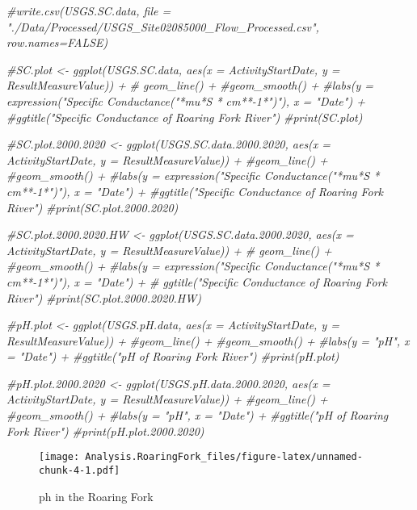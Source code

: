 \documentclass[]{article}
\newenvironment{Shaded}{\begin{snugshade}}{\end{snugshade}}
\newcommand{\CommentTok}[1]{\textcolor[rgb]{0.56,0.35,0.01}{\textit{#1}}}
\begin{document}
\begin{Shaded}
\begin{Highlighting}[]
\CommentTok{#write.csv(USGS.SC.data, file = "./Data/Processed/USGS_Site02085000_Flow_Processed.csv", row.names=FALSE)}
\end{Highlighting}
\end{Shaded}

\begin{Shaded}
\begin{Highlighting}[]
\CommentTok{#SC.plot <- ggplot(USGS.SC.data, aes(x = ActivityStartDate, y = ResultMeasureValue)) +}
 \CommentTok{# geom_line() +}
  \CommentTok{#geom_smooth() +}
  \CommentTok{#labs(y = expression("Specific Conductance("*mu*S * cm**-1*")"), x = "Date") +}
    \CommentTok{#ggtitle("Specific Conductance of Roaring Fork River")}
\CommentTok{#print(SC.plot)}


\CommentTok{#SC.plot.2000.2020 <- ggplot(USGS.SC.data.2000.2020, aes(x = ActivityStartDate, y = ResultMeasureValue)) +}
  \CommentTok{#geom_line() +}
  \CommentTok{#geom_smooth() +}
  \CommentTok{#labs(y = expression("Specific Conductance("*mu*S * cm**-1*")"), x = "Date") +}
    \CommentTok{#ggtitle("Specific Conductance of Roaring Fork River")}
\CommentTok{#print(SC.plot.2000.2020)}

\CommentTok{#SC.plot.2000.2020.HW <- ggplot(USGS.SC.data.2000.2020, aes(x = ActivityStartDate, y = ResultMeasureValue)) +}
 \CommentTok{# geom_line() +}
  \CommentTok{#geom_smooth() +}
  \CommentTok{#labs(y = expression("Specific Conductance("*mu*S * cm**-1*")"), x = "Date") +}
   \CommentTok{# ggtitle("Specific Conductance of Roaring Fork River")}
\CommentTok{#print(SC.plot.2000.2020.HW)}

\CommentTok{#pH.plot <- ggplot(USGS.pH.data, aes(x = ActivityStartDate, y = ResultMeasureValue)) +}
  \CommentTok{#geom_line() +}
  \CommentTok{#geom_smooth() +}
  \CommentTok{#labs(y = "pH", x = "Date") +}
    \CommentTok{#ggtitle("pH of Roaring Fork River")}
\CommentTok{#print(pH.plot)}

\CommentTok{#pH.plot.2000.2020 <- ggplot(USGS.pH.data.2000.2020, aes(x = ActivityStartDate, y = ResultMeasureValue)) +}
  \CommentTok{#geom_line() +}
  \CommentTok{#geom_smooth() +}
  \CommentTok{#labs(y = "pH", x = "Date") +}
    \CommentTok{#ggtitle("pH of Roaring Fork River")}
\CommentTok{#print(pH.plot.2000.2020)}
\end{Highlighting}
\end{Shaded}

\begin{figure}
\centering
\texttt{[image: Analysis.RoaringFork\_files/figure-latex/unnamed-chunk-4-1.pdf]}
\caption{ph in the Roaring Fork}
\end{figure}
\end{document}
